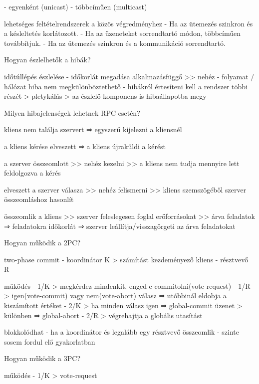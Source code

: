 \documentclass[12pt]{article}
\begin{document}
\begin{description}[style=unboxed]
        - egyenként (unicast)
        - többcíműen (multicast)
    \item lehetséges feltételrendszerek a közös végredményhez 
        - Ha az ütemezés szinkron és a késleltetés korlátozott.
        - Ha az üzeneteket sorrendtartó módon, többcíműen továbbítjuk.
        - Ha az ütemezés szinkron és a kommunikáció sorrendtartó.
    \item  Hogyan észlelhetők a hibák?
    \item időtúllépés észlelése
        - időkorlát megadása alkalmazásfüggő >> nehéz
        - folyamat / hálózat hiba nem megkülönböztethető
        - hibákról értesíteni kell a rendszer többi részét
        > pletykálás
        > az észlelő komponens is hibaállapotba megy
    \item  Milyen hibajelenségek lehetnek RPC esetén?
    \item  kliens nem találja  szervert
        ⇒ egyszerű kijelezni a kliensnél
    \item a kliens kérése elveszett
        ⇒ a kliens újraküldi a kérést
    \item a szerver összeomlott
        >> nehéz kezelni >> a kliens nem tudja mennyire lett feldolgozva a kérés
    \item elveszett a szerver válasza
        >> nehéz felismerni >> kliens szemszögéből szerver összeomláshoz hasonlít
    \item összeomlik a kliens
        >> szerver feleslegesen foglal erőforrásokat >> árva feladatok
        ⇒ feladatokra időkorlát
        ⇒ szerver leállítja/visszagörgeti az árva feladatokat
    \item  Hogyan működik a 2PC?
    \item two-phase commit
        - koordinátor K 
        > számítást kezdeményező kliens
        - résztvevő R
    \item működés
        - 1/K
        > megkérdez mindenkit, enged e commitolni(vote-request)
        - 1/R
        > igen(vote-commit) vagy nem(vote-abort) válasz ⇒ utóbbinál eldobja a kiszámított értéket
        - 2/K
        > ha minden válasz igen ⇒ global-commit üzenet
        > különben ⇒ global-abort
        - 2/R
        > végrehajtja a globális utasítást
    \item blokkolódhat
        - ha a koordinátor és legalább egy résztvevő összeomlik
        - szinte sosem fordul elő gyakorlatban
    \item  Hogyan működik a 3PC?
    \item működés
        - 1/K
        > vote-request

\end{description}
\end{document}
